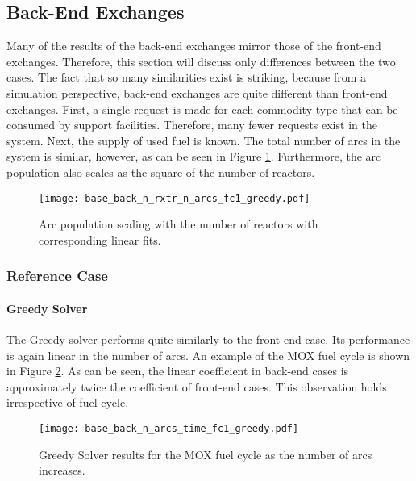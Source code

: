 \subsection{Back-End Exchanges}

Many of the results of the back-end exchanges mirror those of the front-end
exchanges. Therefore, this section will discuss only differences between the two
cases. The fact that so many similarities exist is striking, because from a
simulation perspective, back-end exchanges are quite different than front-end
exchanges. First, a single request is made for each commodity type that can be
consumed by support facilities. Therefore, many fewer requests exist in the
system. Next, the supply of used fuel is known. The total number of arcs in the
system is similar, however, as can be seen in Figure
\ref{fig:base_back_n_rxtr_n_arcs_fc1_greedy}. Furthermore, the arc
population also scales as the square of the number of reactors. 

\begin{figure}[h!]
  \begin{center}
    \texttt{[image: base\_back\_n\_rxtr\_n\_arcs\_fc1\_greedy.pdf]}
    \caption{
      \label{fig:base_back_n_rxtr_n_arcs_fc1_greedy}
      Arc population scaling with the number of reactors with corresponding linear fits.}
  \end{center}
\end{figure}

\subsubsection{Reference Case}

\paragraph{Greedy Solver}

The Greedy solver performs quite similarly to the front-end case. Its
performance is again linear in the number of arcs. An example of the MOX fuel
cycle is shown in Figure \ref{fig:base_back_n_arcs_time_fc1_greedy}. As can be seen,
the linear coefficient in back-end cases is approximately twice the coefficient
of front-end cases. This observation holds irrespective of fuel cycle.

\begin{figure}[h!]
  \begin{center}
    \texttt{[image: base\_back\_n\_arcs\_time\_fc1\_greedy.pdf]}
    \caption{
      \label{fig:base_back_n_arcs_time_fc1_greedy}
      Greedy Solver results for the MOX fuel cycle as the number of arcs
      increases.      
    }
  \end{center}
\end{figure}

